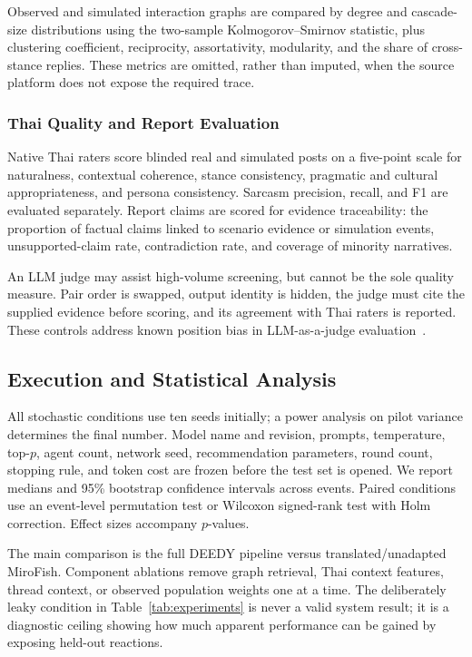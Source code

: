 \documentclass[conference]{IEEEtran}
\begin{document}
Observed and simulated interaction graphs are compared by degree and cascade-
size distributions using the two-sample Kolmogorov--Smirnov statistic, plus
clustering coefficient, reciprocity, assortativity, modularity, and the share
of cross-stance replies. These metrics are omitted, rather than imputed, when
the source platform does not expose the required trace.

\subsubsection{Thai Quality and Report Evaluation}

Native Thai raters score blinded real and simulated posts on a five-point scale
for naturalness, contextual coherence, stance consistency, pragmatic and
cultural appropriateness, and persona consistency. Sarcasm precision, recall,
and F1 are evaluated separately. Report claims are scored for evidence
traceability: the proportion of factual claims linked to scenario evidence or
simulation events, unsupported-claim rate, contradiction rate, and coverage of
minority narratives.

An LLM judge may assist high-volume screening, but cannot be the sole quality
measure. Pair order is swapped, output identity is hidden, the judge must cite
the supplied evidence before scoring, and its agreement with Thai raters is
reported. These controls address known position bias in LLM-as-a-judge
evaluation~\cite{shi2024judging}.

\subsection{Execution and Statistical Analysis}

All stochastic conditions use ten seeds initially; a power analysis on pilot
variance determines the final number. Model name and revision, prompts,
temperature, top-$p$, agent count, network seed, recommendation parameters,
round count, stopping rule, and token cost are frozen before the test set is
opened. We report medians and 95\% bootstrap confidence intervals across
events. Paired conditions use an event-level permutation test or Wilcoxon
signed-rank test with Holm correction. Effect sizes accompany $p$-values.

The main comparison is the full DEEDY pipeline versus translated/unadapted
MiroFish. Component ablations remove graph retrieval, Thai context features,
thread context, or observed population weights one at a time. The deliberately
leaky condition in Table~\ref{tab:experiments} is never a valid system result;
it is a diagnostic ceiling showing how much apparent performance can be gained
by exposing held-out reactions.
\end{document}
